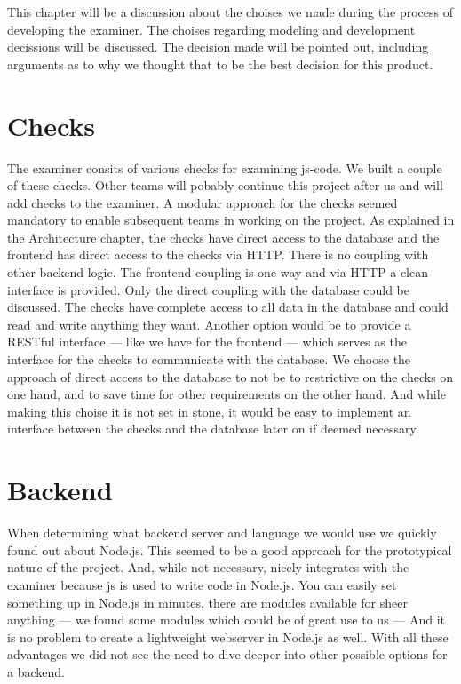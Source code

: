 %

This chapter will be a discussion about the choises we made
during the process of developing the \gls{examiner}.
The choises regarding modeling and development decissions will be discussed.
The decision made will be pointed out,
including arguments as to why we thought
that to be the best decision for this product.

\section{Checks}
The \gls{examiner} consits of various checks for examining \gls{js-code}.
We built a couple of these checks.
Other teams will pobably continue this project after us
and will add checks to the \gls{examiner}.
A modular approach for the checks seemed mandatory to enable
subsequent teams in working on the project.
As explained in the Architecture chapter,
the checks have direct access to the database
and the frontend has direct access to the checks via HTTP.
There is no coupling with other backend logic.
The frontend coupling is one way
and via HTTP a clean interface is provided.
Only the direct coupling with the database could be discussed.
The checks have complete access to all data in the database
and could read and write anything they want.
Another option would be to provide a RESTful interface ---
like we have for the frontend ---
which serves as the interface for the checks to communicate with the database.
We choose the approach of direct access to the database
to not be to restrictive on the checks on one hand,
and to save time for other requirements on the other hand.
And while making this choise it is not set in stone,
it would be easy to implement an interface
between the checks and the database later on if deemed necessary.

\section{Backend}
When determining what backend server and language we would use
we quickly found out about Node.js.
This seemed to be a good approach for the prototypical nature of the project.
And, while not necessary, nicely integrates with the \gls{examiner}
because \gls{js} is used to write code in Node.js.
You can easily set something up in Node.js in minutes,
there are modules available for sheer anything
--- we found some modules which could be of great use to us ---
And it is no problem to create a lightweight webserver in Node.js as well.
With all these advantages we did not see the need
to dive deeper into other possible options for a backend.

